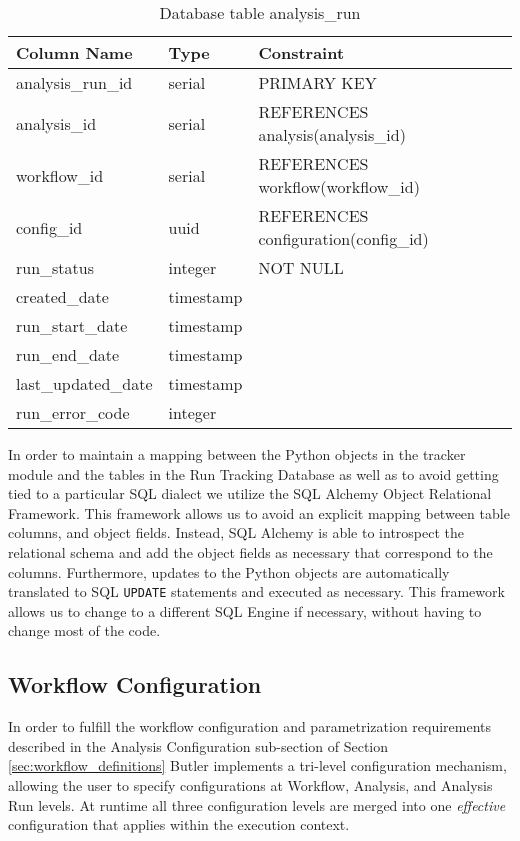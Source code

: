 \begin{table}[H]
\renewcommand{\arraystretch}{1.2} 
\centering
\begin{tabular}{@{}lll@{}}
\toprule
Column Name & Type & Constraint\\
\midrule
analysis\_run\_id & serial & PRIMARY KEY\\
analysis\_id & serial & REFERENCES analysis(analysis\_id)\\
workflow\_id & serial & REFERENCES workflow(workflow\_id)\\
config\_id & uuid & REFERENCES configuration(config\_id)\\
run\_status & integer & NOT NULL\\
created\_date & timestamp\\
run\_start\_date & timestamp\\
run\_end\_date & timestamp\\
last\_updated\_date & timestamp\\
run\_error\_code & integer\\
\bottomrule
\end{tabular}
\caption{Database table analysis\_run}
\end{table}

In order to maintain a mapping between the Python objects in the tracker module and the tables in the Run Tracking Database as well as to avoid getting tied to a particular SQL dialect we utilize the SQL Alchemy Object Relational Framework. This framework allows us to avoid an explicit mapping between table columns, and object fields. Instead, SQL Alchemy is able to introspect the relational schema and add the object fields as necessary that correspond to the columns. Furthermore, updates to the Python objects are automatically translated to SQL \texttt{UPDATE} statements and executed as necessary. This framework allows us to change to a different SQL Engine if necessary, without having to change most of the code.

\subsection{Workflow Configuration} 
\label{sec:workflow_configuration_design}

In order to fulfill the workflow configuration and parametrization requirements described in the Analysis Configuration sub-section of Section \ref{sec:workflow_definitions} Butler implements a tri-level configuration mechanism, allowing the user to specify configurations at Workflow, Analysis, and Analysis Run levels. At runtime all three configuration levels are merged into one \emph{effective} configuration that applies within the execution context.

